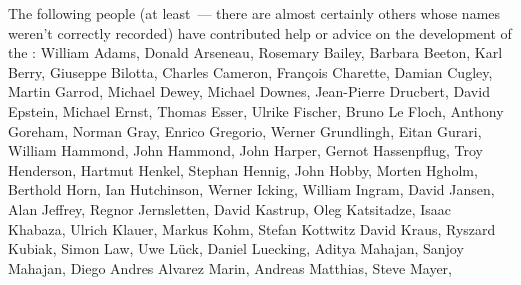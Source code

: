 \begin{introduction}
\htmlignore
The following people (at least~--- there are almost certainly others
whose names weren't correctly recorded) have contributed help or
advice on the development of the :
William Adams, %
Donald Arseneau, %
Rosemary Bailey, %
Barbara Beeton, %
Karl Berry, %
Giuseppe Bilotta,
Charles Cameron,
Fran\c{c}ois Charette, %
Damian Cugley,
Martin Garrod, %
Michael Dewey,
Michael Downes, %
Jean-Pierre Drucbert, %
David Epstein, %
Michael Ernst, %
Thomas Esser,
Ulrike Fischer, %
Bruno Le Floch, %
Anthony Goreham,
Norman Gray,
Enrico Gregorio, %
Werner Grundlingh, %
Eitan Gurari, %
William Hammond, %
John Hammond, %
John Harper, %
Gernot Hassenpflug, %
Troy Henderson, %
Hartmut Henkel,
Stephan Hennig, %
John Hobby,
Morten H\textoslash gholm, %
Berthold Horn, %
Ian Hutchinson, %
Werner Icking, %
William Ingram, %
David Jansen, %
Alan Jeffrey, %
Regnor Jernsletten,
David Kastrup, %
Oleg Katsitadze, %
Isaac Khabaza, %
Ulrich Klauer, %
Markus Kohm, %
Stefan Kottwitz %
David Kraus, %
Ryszard Kubiak, %
Simon Law,
Uwe L\"uck, %
Daniel Luecking, %
Aditya Mahajan, %
Sanjoy Mahajan,
Diego Andres Alvarez Marin, %
Andreas Matthias, %
Steve Mayer, %

\end{introduction}
